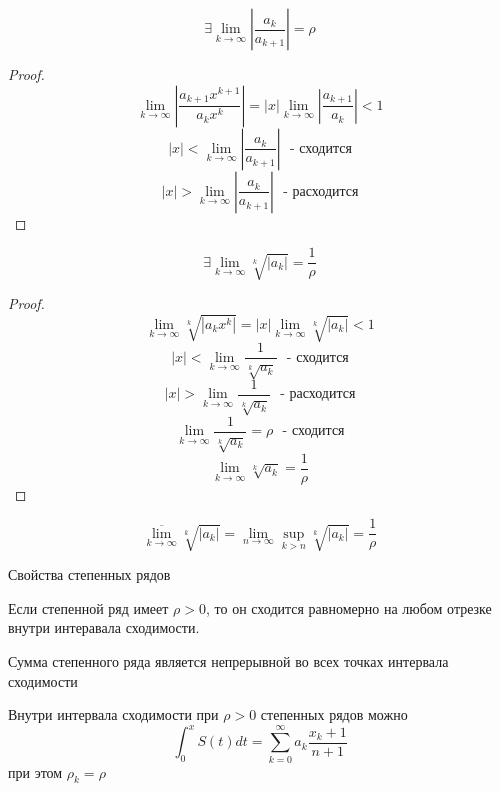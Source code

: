 \begin{theorem}
  $$
  \exists \lim_{k \to \infty} \left| \frac{a_k}{a_{k+1}} \right| = \rho
  $$
\end{theorem}

\begin{proof}
  $$
  \lim_{k \to \infty} \left| \frac{a_{k+1} x^{k+1}}{a_k x^k} \right| =
  |x| \lim_{k \to \infty} \left| \frac{a_{k+1}}{a_k} \right| < 1
  $$
  $$
  |x| < \lim_{k \to \infty} \left| \frac{a_k}{a_{k+1}} \right| ~~~
  \text{- сходится}
  $$
  $$
  |x| > \lim_{k \to \infty} \left| \frac{a_k}{a_{k+1}} \right| ~~~
  \text{- расходится}
  $$
\end{proof}

\begin{theorem}
  $$
  \exists \lim_{k \to \infty} \sqrt[k]{|a_k|} = \frac{1}{\rho}
  $$
\end{theorem}

\begin{proof}
  $$
  \lim_{k \to \infty} \sqrt[k]{|a_k x^k|} = |x| \lim_{k \to \infty}
  \sqrt[k]{|a_k|} < 1
  $$
  $$
  |x| < \lim_{k \to \infty} \frac{1}{\sqrt[k]{a_k}} ~~~ \text{- сходится}
  $$
  $$
  |x| > \lim_{k \to \infty} \frac{1}{\sqrt[k]{a_k}} ~~~ \text{- расходится}
  $$
  $$
  \lim_{k \to \infty} \frac{1}{\sqrt[k]{a_k}} = \rho ~~~ \text{- сходится}
  $$
  $$
  \lim_{k \to \infty} \sqrt[k]{a_k} = \frac{1}{\rho}
  $$
\end{proof}

\begin{block}
  $$
  \overline{\lim_{k \to \infty}} \sqrt[k]{|a_k|} =
  \lim_{n \to \infty} \sup_{k > n}\sqrt[k]{|a_k|} = \frac{1}{\rho}
  $$
\end{block}

\begin{title}[\Large]
  Свойства степенных рядов
\end{title}

\begin{theorem}
  Если степенной ряд имеет $\rho > 0$, то он сходится равномерно
  на любом отрезке внутри интеравала сходимости.
\end{theorem}

\begin{block}[Следствие 1]
  Сумма степенного ряда является непрерывной во всех точках интервала сходимости
\end{block}

\begin{block}[Следствие 2]
  Внутри интервала сходимости при $\rho > 0$ степенных рядов можно
  $$
  \int_0^x S(t)dt = \sum_{k=0}^{\infty} a_k \frac{x_k+1}{n+1}
  $$
  при этом $\rho_k = \rho$
\end{block}

